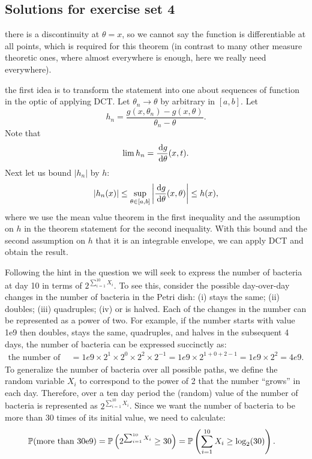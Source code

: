 \documentclass{article}
\begin{document}
\subsection{Solutions for exercise set 4}

 there is a discontinuity at $\theta = x$, so we cannot say the function is differentiable at all points, which is required for this theorem (in contrast to many other measure theoretic ones, where almost everywhere is enough, here we really need everywhere).

 the first idea is to transform the statement into one about sequences of function in the optic of applying DCT. Let $\theta_n \to \theta$ by arbitrary in $[a,b]$. Let 
\[ h_n = \frac{g(x, \theta_n) - g(x, \theta)}{\theta_n - \theta}. \]
Note that
\[ \lim h_n = \frac{\ud g}{\ud \theta}(x, t). \]
Next let us bound $|h_n|$ by $h$:
\[ |h_n(x) | \le \sup_{\theta \in [a,b]} \left| \frac{\ud g}{\ud \theta}(x,\theta)\right| \le h(x), \] 
where we use the mean value theorem in the first inequality and the assumption on $h$ in the theorem statement for the second inequality. With this bound and the second assumption on $h$ that it is an integrable envelope, we can apply DCT and obtain the result.

 Following the hint in the question we will seek to express the number of bacteria at day 10 in terms of $2^{\sum_{i=1}^{10} X_i}$. To see this, consider the possible day-over-day changes in the number of bacteria in the Petri dish: (i) stays the same; (ii) doubles; (iii) quadruples; (iv) or is halved. Each of the changes in the number can be represented as a power of two. For example, if the number starts with value 1e9 then doubles, stays the same, quadruples, and halves in the subsequent 4 days,  the number of bacteria can be expressed succinctly as: 
\begin{align*}
\mbox{the number of bacteria after 4 days} &= 1e9 \times 2^1 \times 2^0 \times 2^2 \times 2^{-1} =
1e9 \times 2^{1 + 0 + 2 - 1} = 1e9 \times 2^{2} = 4e9. 
\end{align*}
To generalize the number of bacteria over all possible paths, we define the random variable $X_i$ to correspond to the power of 2 that the number ``grows'' in each day. Therefore, over a ten day period the (random) value of the number of bacteria is represented as $2^{\sum_{i=1}^{10} X_i}$. Since we want the number of bacteria to be more than 30 times of its initial value, we need to calculate:
\begin{align*}
\P(\mbox{more than 30e9}) &= \P\left(2^{\sum_{i=1}^{10}X_i} \geq 30\right) = \P\left(\sum_{i=1}^{10}X_i \geq \log_2(30)\right).
\end{align*}
\end{document}
